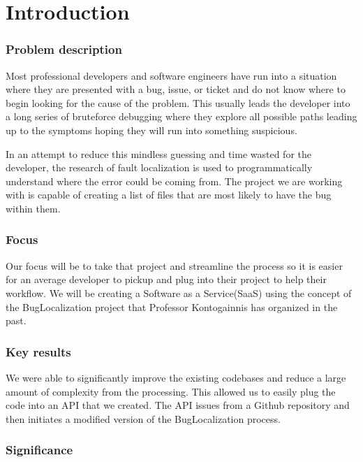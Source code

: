 \documentclass[12pt]{article}
\begin{document}
\section{Introduction}\label{introduction}

\subsubsection{Problem description}\label{problem-description}

Most professional developers and software engineers have run into a
situation where they are presented with a bug, issue, or ticket and do
not know where to begin looking for the cause of the problem. This
usually leads the developer into a long series of bruteforce debugging
where they explore all possible paths leading up to the symptoms hoping
they will run into something suspicious.

In an attempt to reduce this mindless guessing and time wasted for the
developer, the research of fault localization is used to
programmatically understand where the error could be coming from. The
project we are working with is capable of creating a list of files that
are most likely to have the bug within them.

\subsubsection{Focus}\label{focus}

Our focus will be to take that project and streamline the process so it
is easier for an average developer to pickup and plug into their project
to help their workflow. We will be creating a Software as a
Service(SaaS) using the concept of the BugLocalization project that
Professor Kontogainnis has organized in the past.

\subsubsection{Key results}\label{key-results}

We were able to significantly improve the existing codebases and reduce
a large amount of complexity from the processing. This allowed us to
easily plug the code into an API that we created. The API issues from a
Github repository and then initiates a modified version of the
BugLocalization process.

\subsubsection{Significance}\label{significance}
\end{document}

